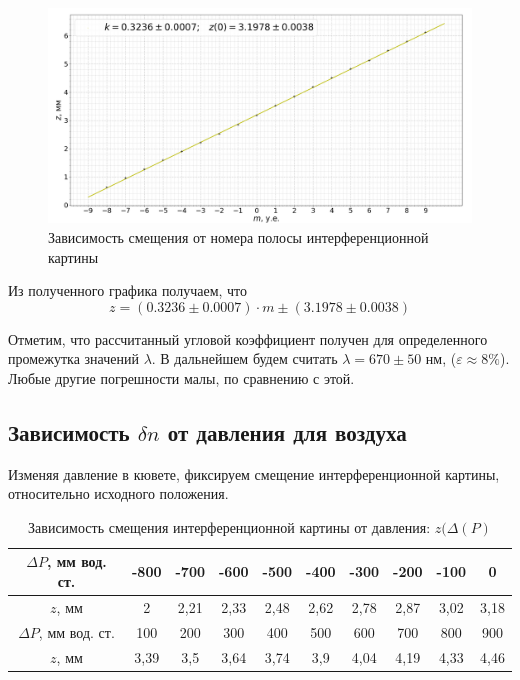 \begin{figure}[h!]
		\includegraphics[width = 1.03\linewidth]{graph1.png}
		\caption{Зависимость смещения от номера полосы интерференционной картины}
\end{figure}

Из полученного графика получаем, что 
$$z = (0.3236 \pm 0.0007)\cdot m \pm (3.1978 \pm 0.0038) $$

Отметим, что рассчитанный угловой коэффициент получен для определенного промежутка значений $\lambda$. В дальнейшем  будем считать $\lambda = 670 \pm 50$ нм, ($\varepsilon \approx 8\%$). Любые другие погрешности малы, по сравнению с этой.

\newpage
\subsection{Зависимость $\delta n$ от давления для воздуха}

Изменяя давление в кювете, фиксируем смещение интерференционной картины, относительно исходного положения.

\begin{table}[!ht]
    \centering
    \caption{Зависимость смещения интерференционной картины от давления: $z(\Delta(P)$}
    \begin{tabular}{|c|c|c|c|c|c|c|c|c|c|}
    \hline
        $\Delta P$, мм вод. ст. & -800 & -700 & -600 & -500 & -400 & -300 & -200 & -100 & 0  \\ \hline
        $z$, мм & 2 & 2,21 & 2,33 & 2,48 & 2,62 & 2,78 & 2,87 & 3,02 & 3,18  \\ \hline\hline
        $\Delta P$, мм вод. ст. & 100 & 200 & 300 & 400 & 500 & 600 & 700 & 800 & 900  \\ \hline
        $z$, мм & 3,39 & 3,5 & 3,64 & 3,74 & 3,9 & 4,04 & 4,19 & 4,33 & 4,46  \\ \hline
    \end{tabular}
\end{table}

